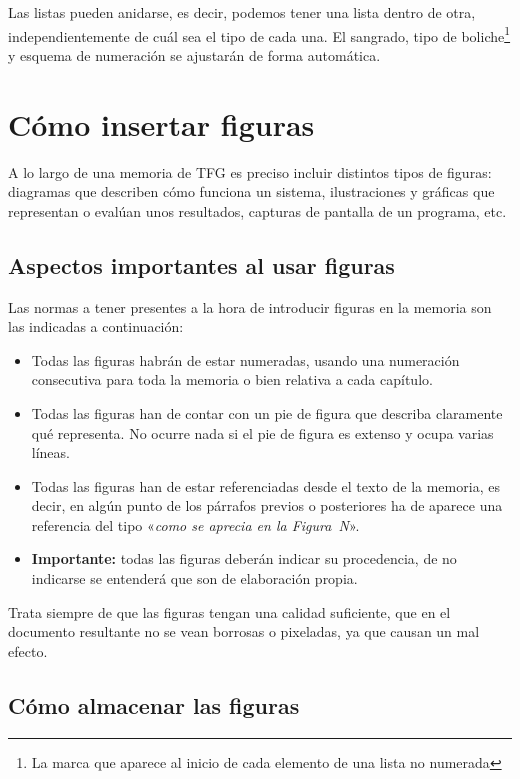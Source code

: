 Las listas pueden anidarse, es decir, podemos tener una lista dentro de otra, independientemente de cuál sea el tipo de cada una. El sangrado, tipo de boliche\footnote{La marca que aparece al inicio de cada elemento de una lista no numerada} y esquema de numeración se ajustarán de forma automática.

\section{Cómo insertar figuras}

A lo largo de una memoria de TFG es preciso incluir distintos tipos de figuras: diagramas que describen cómo funciona un sistema, ilustraciones y gráficas que representan o evalúan unos resultados, capturas de pantalla de un programa, etc. 

\subsection{Aspectos importantes al usar figuras}

Las normas a tener presentes a la hora de introducir figuras en la memoria son las indicadas a continuación:

\begin{itemize}
    \item Todas las figuras habrán de estar numeradas, usando una numeración consecutiva para toda la memoria o bien relativa a cada capítulo.
    
    \item Todas las figuras han de contar con un pie de figura que describa claramente qué representa. No ocurre nada si el pie de figura es extenso y ocupa varias líneas.
    
    \item Todas las figuras han de estar referenciadas desde el texto de la memoria, es decir, en algún punto de los párrafos previos o posteriores ha de aparece una referencia del tipo «\textit{como se aprecia en la Figura~N}».
    
    \item \textbf{Importante:} todas las figuras deberán indicar su procedencia, de no indicarse se entenderá que son de elaboración propia.
\end{itemize}

Trata siempre de que las figuras tengan una calidad suficiente, que en el documento resultante no se vean borrosas o pixeladas, ya que causan un mal efecto.

\subsection{Cómo almacenar las figuras}

